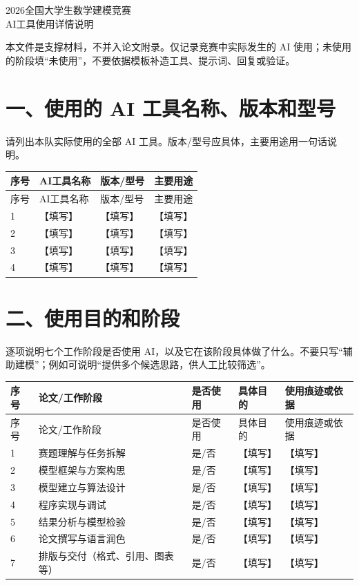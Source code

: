 \documentclass[UTF8,a4paper,11pt]{ctexart}
\begin{document}
\begin{center}
  {\heiti 2026全国大学生数学建模竞赛\\AI工具使用详情说明\par}
\end{center}

\noindent 本文件是支撑材料，不并入论文附录。仅记录竞赛中实际发生的 AI 使用；未使用的阶段填“未使用”，不要依据模板补造工具、提示词、回复或验证。

\section*{一、使用的 AI 工具名称、版本和型号}

请列出本队实际使用的全部 AI 工具。版本/型号应具体，主要用途用一句话说明。

\begin{longtable}{p{0.7cm}p{3.0cm}p{3.0cm}p{8.1cm}}
  \toprule
  序号 & AI工具名称 & 版本/型号 & 主要用途 \\
  \midrule
  \endfirsthead
  \toprule
  序号 & AI工具名称 & 版本/型号 & 主要用途 \\
  \midrule
  \endhead
  1 & 【填写】 & 【填写】 & 【填写】 \\
  2 & 【填写】 & 【填写】 & 【填写】 \\
  3 & 【填写】 & 【填写】 & 【填写】 \\
  4 & 【填写】 & 【填写】 & 【填写】 \\
  \bottomrule
\end{longtable}

\section*{二、使用目的和阶段}

逐项说明七个工作阶段是否使用 AI，以及它在该阶段具体做了什么。不要只写“辅助建模”；例如可说明“提供多个候选思路，供人工比较筛选”。

\begin{longtable}{p{0.6cm}p{2.5cm}p{1.0cm}p{5.7cm}p{5.3cm}}
  \toprule
  序号 & 论文/工作阶段 & 是否使用 & 具体目的 & 使用痕迹或依据 \\
  \midrule
  \endfirsthead
  \toprule
  序号 & 论文/工作阶段 & 是否使用 & 具体目的 & 使用痕迹或依据 \\
  \midrule
  \endhead
  1 & 赛题理解与任务拆解 & 是/否 & 【填写】 & 【填写】 \\
  2 & 模型框架与方案构思 & 是/否 & 【填写】 & 【填写】 \\
  3 & 模型建立与算法设计 & 是/否 & 【填写】 & 【填写】 \\
  4 & 程序实现与调试 & 是/否 & 【填写】 & 【填写】 \\
  5 & 结果分析与模型检验 & 是/否 & 【填写】 & 【填写】 \\
  6 & 论文撰写与语言润色 & 是/否 & 【填写】 & 【填写】 \\
  7 & 排版与交付（格式、引用、图表等） & 是/否 & 【填写】 & 【填写】 \\
  \bottomrule
\end{longtable}
\end{document}
